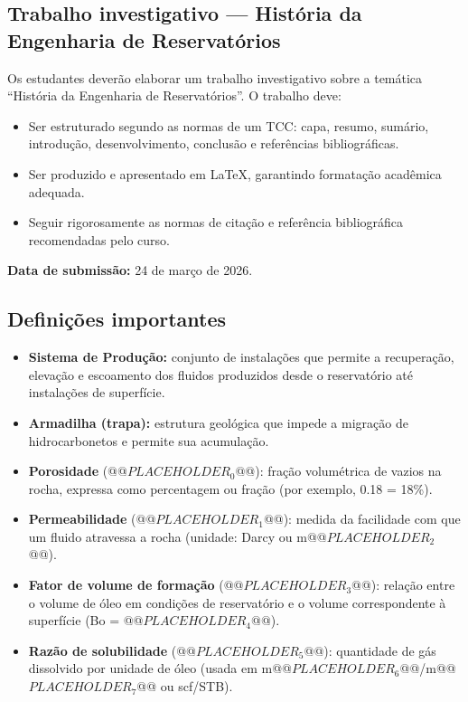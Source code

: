 \documentclass[11pt,a4paper]{article}
\begin{document}
\subsection{Trabalho investigativo — História da Engenharia de Reservatórios}
 Os estudantes deverão elaborar um trabalho investigativo sobre a temática “História da Engenharia de Reservatórios”. O trabalho deve:
\begin{itemize}
\item Ser estruturado segundo as normas de um TCC: capa, resumo, sumário, introdução, desenvolvimento, conclusão e referências bibliográficas.
\item Ser produzido e apresentado em LaTeX, garantindo formatação acadêmica adequada.
\item Seguir rigorosamente as normas de citação e referência bibliográfica recomendadas pelo curso.
\end{itemize}

 \textbf{Data de submissão:} 24 de março de 2026.

\subsection{Definições importantes}
\begin{itemize}
\item \textbf{Sistema de Produção:} conjunto de instalações que permite a recuperação, elevação e escoamento dos fluidos produzidos desde o reservatório até instalações de superfície.
\item \textbf{Armadilha (trapa):} estrutura geológica que impede a migração de hidrocarbonetos e permite sua acumulação.
\item \textbf{Porosidade} (@@$PLACEHOLDER_{0}$@@): fração volumétrica de vazios na rocha, expressa como percentagem ou fração (por exemplo, 0.18 = 18\%).
\item \textbf{Permeabilidade} (@@$PLACEHOLDER_{1}$@@): medida da facilidade com que um fluido atravessa a rocha (unidade: Darcy ou m@@$PLACEHOLDER_{2}$@@).
\item \textbf{Fator de volume de formação} (@@$PLACEHOLDER_{3}$@@): relação entre o volume de óleo em condições de reservatório e o volume correspondente à superfície (Bo = @@$PLACEHOLDER_{4}$@@).
\item \textbf{Razão de solubilidade} (@@$PLACEHOLDER_{5}$@@): quantidade de gás dissolvido por unidade de óleo (usada em m@@$PLACEHOLDER_{6}$@@/m@@$PLACEHOLDER_{7}$@@ ou scf/STB).
\end{itemize}
\end{document}
